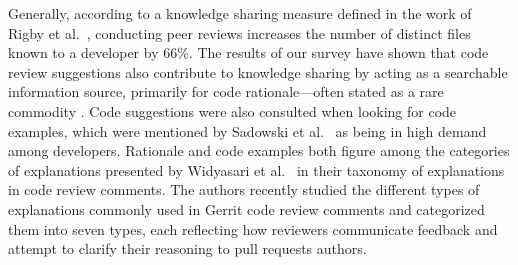 Generally, according to a knowledge sharing measure defined in the work of Rigby et al.~\cite{Rigby_Convergent_Contemporary_CR_2013}, conducting peer reviews increases the number of distinct files known to a developer by  66\%. 
The results of our survey have shown that code review suggestions also contribute to knowledge sharing by acting as a searchable information source, primarily for code rationale—often stated as a rare commodity \cite{Dutoit:Book:2006, LaToza_Questions_Code_2010, Maalej:TSE:2013}.
Code suggestions were also consulted when looking for code examples, which were mentioned by Sadowski et al.~\cite{Sadowski_Search_Code_2015} as being  in high demand among developers.
Rationale and code examples both figure among the categories of explanations presented by Widyasari et al.~\cite{Widyasari:TOSEM:2024} in their taxonomy of explanations in code review comments. 
The authors recently studied the different types of explanations commonly used in Gerrit code review comments and categorized them into seven types, each reflecting how reviewers communicate feedback and attempt to clarify their reasoning to pull requests authors.

